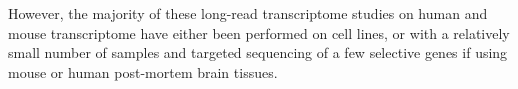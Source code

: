 However, the majority of these long-read transcriptome studies on human and mouse transcriptome have either been performed on cell lines, or with a relatively small number of samples and targeted sequencing of a few selective genes if using mouse or human post-mortem brain tissues. 





